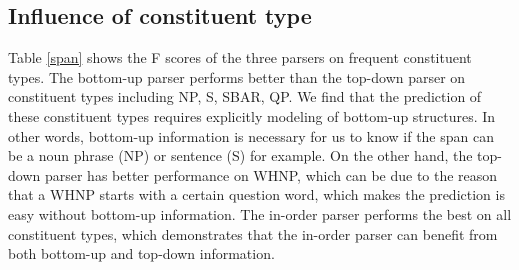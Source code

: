 \documentclass[11pt,letterpaper]{article}
\begin{document}
\subsection{Influence of constituent type}
Table \ref{span} shows the F scores of the three parsers on frequent constituent types.
The bottom-up parser performs better than the top-down parser on constituent types including NP, S, SBAR, QP.
We find that the prediction of these constituent types requires explicitly modeling of bottom-up structures.
In other words, bottom-up information is necessary for us to know if the span can be a noun phrase (NP) or sentence (S) for example.
On the other hand, the top-down parser has better performance on WHNP, which can be due to the reason that a WHNP starts with a certain question word, which makes the prediction is easy without bottom-up information.
The in-order parser performs the best on all constituent types, which demonstrates that the in-order parser can benefit from both bottom-up and top-down information. 
\end{document}
